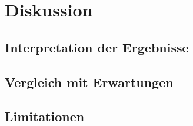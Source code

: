 \chapter{Diskussion}
\section{Interpretation der Ergebnisse}
\section{Vergleich mit Erwartungen}
\section{Limitationen}